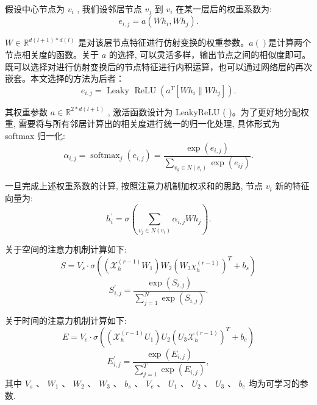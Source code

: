 假设中心节点为 \({{v}}_{{i}}\) , 我们设邻居节点 \({{v}}_{{j}}\) 到 \({{v}}_{{i}}\) 在某一层后的权重系数为:
\begin{equation}
{e}_{i, j} = a\left( {W{h}_{i}, W{h}_{j}}\right).
\end{equation}

\({W} \in  \mathbb{R}^{d\left( {l + 1}\right)  * d\left( l\right) }\) 是对该层节点特征进行仿射变换的权重参数。$a()$是计算两个节点相关度的函数。关于 \({a}\) 的选择, 可以灵活多样，输出节点之间的相似度即可。既可以选择对进行仿射变换后的节点特征进行内积运算，也可以通过网络层的再次嵌套。本文选择的方法为后者：
\begin{equation}
{{e}}_{{i}, {j}} = \text{ Leaky }\operatorname{ReLU}\left( {{{a}}^{{T}}\left\lbrack  {{{{Wh}}}_{{i}}\parallel {{{Wh}}}_{{j}}}\right\rbrack  }\right).
\end{equation}

其权重参数 \({a} \in  {\mathbb{R}}^{2 * {d}\left( {{l} + 1}\right) }\) , 激活函数设计为 LeakyReLU (   )。为了更好地分配权重, 需要将与所有邻居计算出的相关度进行统一的归一化处理, 具体形式为 softmax 归一化:
\begin{equation}
{\alpha }_{i, j} = {\operatorname{softmax}}_{j}\left( {e}_{i, j}\right)  = \frac{\exp \left( {e}_{i, j}\right) }{\mathop{\sum }\limits_{{{v}_{k} \in  N\left( {v}_{i}\right) }}\exp \left( {e}_{ij}\right) }.
\end{equation}

一旦完成上述权重系数的计算, 按照注意力机制加权求和的思路, 节点 \({{v}}_{{i}}\) 新的特征向量为:
\begin{equation}
{h}_{i}^{\prime } = \sigma \left( {\mathop{\sum }\limits_{{{v}_{j} \in  N\left( {v}_{i}\right) }}{\alpha }_{i, j}W{h}_{j}}\right).
\end{equation}

关于空间的注意力机制计算如下:
\begin{equation}
S = {V}_{s} \cdot  \sigma \left( {\left( {{\mathcal{X}}_{h}^{\left( r - 1\right) }{W}_{1}}\right) {W}_{2}{\left( {W}_{3}{\chi }_{h}^{\left( r - 1\right) }\right) }^{T} + {b}_{s}}\right)
\end{equation}
\begin{equation}
{S}_{i, j}^{\prime } = \frac{\exp \left( {S}_{i, j}\right) }{\mathop{\sum }\limits_{{j = 1}}^{N}\exp \left( {S}_{i, j}\right) }.
\end{equation}

关于时间的注意力机制计算如下:
\begin{equation}
{E} = {{V}}_{{e}} \cdot  \sigma \left( {\left( {{\mathcal{X}}_{{h}}^{\left( {r} - 1\right) }{{U}}_{1}}\right) {{U}}_{2}{\left( {{U}}_{3}{\mathcal{X}}_{{h}}^{\left( {r} - 1\right) }\right) }^{{T}} + {{b}}_{{e}}}\right)
\end{equation}
\begin{equation}
{E}_{i, j}^{\prime } = \frac{\exp \left( {E}_{i, j}\right) }{\mathop{\sum }\limits_{{j = 1}}^{T}\exp \left( {E}_{i, j}\right) }, 
\end{equation}
其中 \({{V}}_{{s}}\) 、 \({{W}}_{1}\) 、 \({{W}}_{2}\) 、 \({{W}}_{3}\) 、 \({{b}}_{{s}}\) 、 \({{V}}_{{e}}\) 、 \({{U}}_{1}\) 、 \({{U}}_{2}\) 、 \({{U}}_{3}\) 、 \({{b}}_{{e}}\) 均为可学习的参数.

